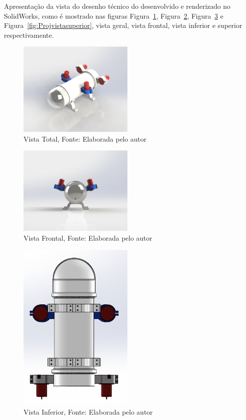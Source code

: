 Apresentação da vista do desenho técnico do \rovname \space desenvolvido e renderizado no SolidWorks, como é mostrado nas figuras Figura~\ref{fig:Projvistatotal}, Figura~\ref{fig:Projvistafrnotal}, Figura~\ref{fig:Projvistainferior} e Figura~\ref{fig:Projvistasuperior}, vista geral, vista frontal, vista inferior e superior respectivamente.

\begin{figure}[!htb]
	\centering	
	\includegraphics[width=0.5\textwidth]{Figures/Rov/Proj_vista_total.jpeg}
	\caption{Vista Total, Fonte: Elaborada pelo autor\the\year}
	\label{fig:Projvistatotal}
\end{figure}

\begin{figure}[!htb]
	\centering	
	\includegraphics[width=0.5\textwidth]{Figures/Rov/Proj_vista_frontal.jpeg}
	\caption{Vista Frontal, Fonte: Elaborada pelo autor\the\year}
	\label{fig:Projvistafrnotal}
\end{figure}

\begin{figure}[!htb]
	\centering	
	\includegraphics[angle=90,width=0.5\textwidth]{Figures/Rov/Proj_vista_inferior.jpeg}
	\caption{Vista Inferior, Fonte: Elaborada pelo autor\the\year}
	\label{fig:Projvistainferior}
\end{figure}

